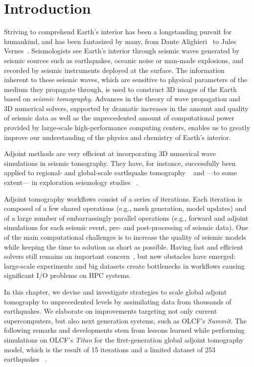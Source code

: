 \section{Introduction}\label{sec:intro}

Striving to comprehend Earth's interior has been a longstanding pursuit for
humankind, and has been fantasized by many, from Dante Alighieri~\cite{Dante1320}
to Jules Vernes~\cite{Vernes1864}.
Seismologists see Earth's interior through seismic waves generated by seismic
sources such as earthquakes, oceanic noise or man-made explosions, and
recorded by seismic instruments deployed at the surface.
The information inherent to these seismic waves, which are sensitive
to physical parameters of the medium they propagate through, is used to construct
3D images of the Earth based on \emph{seismic tomography}.
Advances in the theory of wave propagation and 3D numerical solvers, supported by
dramatic increases in the amount and quality of seismic data as well as
the unprecedented amount of computational power provided by large-scale high-performance
computing centers, enables us to greatly improve our understanding of the
physics and chemistry of Earth's interior.

Adjoint methods are very efficient at 
incorporating 3D numerical wave simulations in seismic tomography.
They have, for instance, successfully been
applied to regional- and global-scale earthquake tomography
~\cite{tape2009adjoint, Fichtner09,
zhu2012structure, bozdaug2016global} and ---to some extent--- in exploration seismology studies
~\cite{Zhu2009, Luo2013}.

Adjoint tomography workflows consist of a series of iterations. Each iteration is
composed of a few shared operations (e.g., mesh generation, model updates) and
of a large number of embarrassingly parallel operations (e.g., forward and
adjoint simulations for each seismic event, pre- and post-processing of seismic
data).
One of the main computational challenges is to increase the quality of seismic
models while keeping the time to solution as short as possible. Having fast and
efficient solvers still remains an important concern~\cite{Rietmann2012}, but
new obstacles have emerged: large-scale experiments and big datasets create
bottlenecks in workflows causing significant I/O problems on HPC systems.

In this chapter, we devise and investigate strategies to scale global
adjoint tomography to unprecedented levels by assimilating data from thousands
of earthquakes. We elaborate on improvements targeting not only current
supercomputers, but also next generation systems, such as OLCF's \emph{Summit}. The
following remarks and developments stem from lessons learned while performing
simulations on OLCF's \emph{Titan} for the first-generation global adjoint tomography 
model, which is the result of 15 iterations and a limited dataset of 253 earthquakes
~\cite{bozdaug2016global}.

